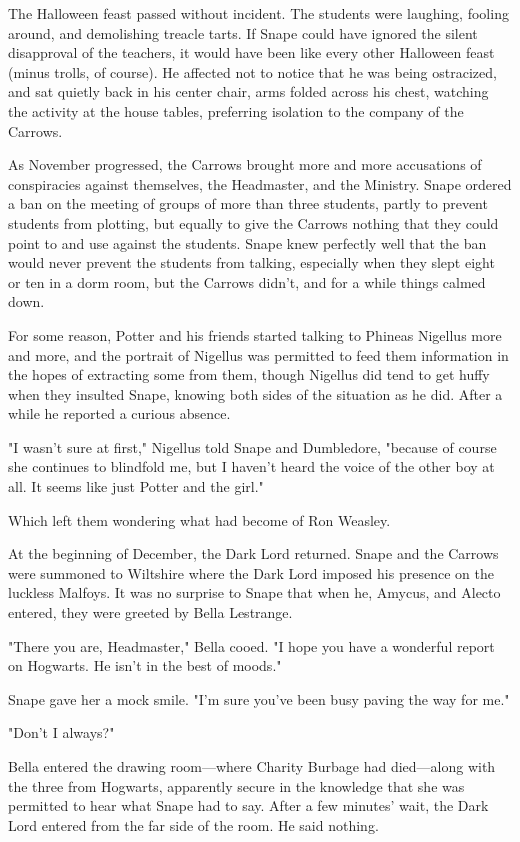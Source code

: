 The Halloween feast passed without incident. The students were laughing, fooling around, and demolishing treacle tarts. If Snape could have ignored the silent disapproval of the teachers, it would have been like every other Halloween feast (minus trolls, of course). He affected not to notice that he was being ostracized, and sat quietly back in his center chair, arms folded across his chest, watching the activity at the house tables, preferring isolation to the company of the Carrows.

As November progressed, the Carrows brought more and more accusations of conspiracies against themselves, the Headmaster, and the Ministry. Snape ordered a ban on the meeting of groups of more than three students, partly to prevent students from plotting, but equally to give the Carrows nothing that they could point to and use against the students. Snape knew perfectly well that the ban would never prevent the students from talking, especially when they slept eight or ten in a dorm room, but the Carrows didn't, and for a while things calmed down.

For some reason, Potter and his friends started talking to Phineas Nigellus more and more, and the portrait of Nigellus was permitted to feed them information in the hopes of extracting some from them, though Nigellus did tend to get huffy when they insulted Snape, knowing both sides of the situation as he did. After a while he reported a curious absence.

"I wasn't sure at first," Nigellus told Snape and Dumbledore, "because of course she continues to blindfold me, but I haven't heard the voice of the other boy at all. It seems like just Potter and the girl."

Which left them wondering what had become of Ron Weasley.

At the beginning of December, the Dark Lord returned. Snape and the Carrows were summoned to Wiltshire where the Dark Lord imposed his presence on the luckless Malfoys. It was no surprise to Snape that when he, Amycus, and Alecto entered, they were greeted by Bella Lestrange.

"There you are, Headmaster," Bella cooed. "I hope you have a wonderful report on Hogwarts. He isn't in the best of moods."

Snape gave her a mock smile. "I'm sure you've been busy paving the way for me."

"Don't I always?"

Bella entered the drawing room—where Charity Burbage had died—along with the three from Hogwarts, apparently secure in the knowledge that she was permitted to hear what Snape had to say. After a few minutes' wait, the Dark Lord entered from the far side of the room. He said nothing.

